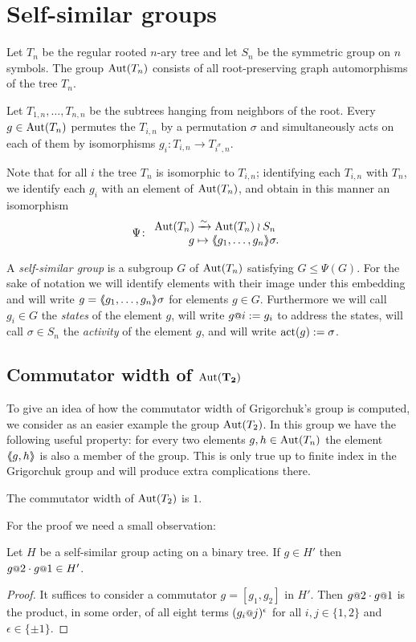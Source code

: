 \documentclass[a4paper,11pt]{amsart}
\begin{document}
\section{Self-similar groups}\label{sec:SelfSimilarGroups}
Let $T_n$ be the regular rooted $n$-ary tree and let $S_n$ be the symmetric group on $n$ symbols.
The group $\operatorname{{Aut}}(T_n)$ consists of all root-preserving graph automorphisms of the tree $T_n$. 

Let $T_{1,n},\dotsc,T_{n,n}$ be the subtrees hanging from neighbors of the root. 
Every $g\in\operatorname{{Aut}}(T_n)$ permutes the $T_{i,n}$ by a permutation $\sigma$ and simultaneously
acts on each of them by isomorphisms $g_i\colon T_{i,n}\to T_{i^\sigma,n}$.

Note that for all $i$ the tree $T_n$ is isomorphic to $T_{i,n}$;
identifying each $T_{i,n}$ with $T_n$, we identify each $g_i$ with an
element of $\operatorname{{Aut}}(T_n)$, and obtain in this manner an isomorphism
\[\Psi\colon\begin{array}{r@{\;}l}
              \Aut(T_n) &\xrightarrow{\sim} \Aut(T_n)\wr S_n\\
              g &\mapsto \pair{g_1,\dotsc,g_n}\sigma.
            \end{array}
\]

A \emph{self-similar group} is a subgroup $G$ of $\operatorname{{Aut}}(T_n)$
satisfying $G\leq \Psi(G)$.  For the sake of notation we will identify
elements with their image under this embedding and will write
$g=\langle\negthickspace\langle g_1,\dotsc,g_n\rangle\negthickspace\rangle\sigma$ for elements $g\in G$.  Furthermore we
will call $g_i\in G$ the \emph{states} of the element $g$, will write
$g\at{i}:=g_i$ to address the states, will call $\sigma \in S_n$ the
\emph{activity} of the element $g$, and will write $\operatorname{act}(g):= \sigma$.

\subsection{Commutator width of \texorpdfstring{$\mathbf{\textup{Aut}(T_2)}$}{Aut(T2)} }
To give an idea of how the commutator width of Grigorchuk's group is
computed, we consider as an easier example the group $\operatorname{{Aut}}(T_2)$. In
this group we have the following useful property: for every two
elements $g,h\in \operatorname{{Aut}}(T_n)$ the element $\langle\negthickspace\langle g,h\rangle\negthickspace\rangle$ is also a member
of the group.  This is only true up to finite index in the Grigorchuk
group and will produce extra complications there.

\begin{pro}\label{pro:comwidthAutT2}
 The commutator width of $\operatorname{{Aut}}(T_2)$ is $1$.
\end{pro}
For the proof we need a small observation:
\begin{lem}\label{lem:H'}
  Let $H$ be a self-similar group acting on a binary tree.
  If $g\in H'$ then $g\at{2}\cdot g\at{1}\in H'$. 
\end{lem}
\begin{proof}
  It suffices to consider a commutator $g=[g_1,g_2]$ in $H'$. Then
  $g\at 2\cdot g\at 1$ is the product, in some order, of all eight
  terms $(g_i\at j)^\epsilon$ for all $i,j\in\{1,2\}$ and
  $\epsilon\in\{\pm1\}$.
\end{proof}
\end{document}
